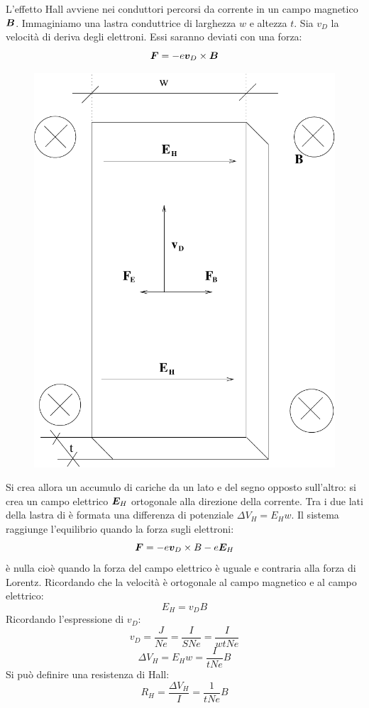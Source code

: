\begin{Es}
  L'effetto Hall avviene nei conduttori percorsi da corrente in un campo magnetico $\boldsymbol{B}$. Immaginiamo una lastra conduttrice di larghezza $w$ e altezza $t$. Sia $v_D$ la velocità di deriva degli elettroni. Essi saranno deviati con una forza:
  \[\boldsymbol{F}=-e\boldsymbol{v}_D\times \boldsymbol{B}\]
  \begin{figure}[htbp]
    \centering
    \includegraphics[scale=0.4]{immagini/fisica2/Hall}
  \end{figure}
  Si crea allora un accumulo di cariche da un lato e del segno opposto sull'altro: si crea un campo elettrico $\boldsymbol{E}_H$ ortogonale alla direzione della corrente. Tra i due lati della lastra di è formata una differenza di potenziale $\Delta V_H=E_Hw$. Il sistema raggiunge l'equilibrio quando la forza sugli elettroni:
  \[\boldsymbol{F}=-e\boldsymbol{v}_D\times B-e\boldsymbol{E}_H\]
  è nulla cioè quando la forza del campo elettrico è uguale e contraria alla forza di Lorentz. Ricordando che la velocità è ortogonale al campo magnetico e al campo elettrico:
  \[E_H=v_DB\]
  Ricordando l'espressione di $v_D$:
  \[v_D=\frac{J}{Ne}=\frac{I}{SNe}=\frac{I}{wtNe}\]
  \[\Delta V_H=E_Hw=\frac{I}{tNe}B\]
  Si può definire una resistenza di Hall:
  \[
    R_H = \frac{\Delta V_H}{I}=\frac{1}{tNe}B
  \]
\end{Es}

